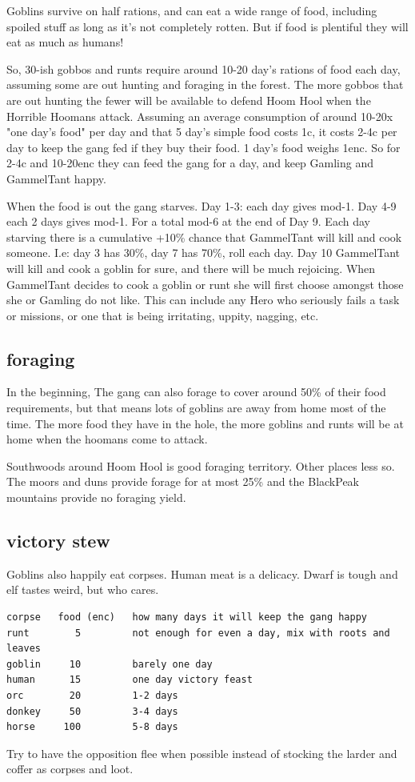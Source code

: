 Goblins survive on half rations, and can eat a wide range of food, including spoiled stuff as long as it's not completely rotten. But if food is plentiful they will eat as much as humans!

So, 30-ish gobbos and runts require around 10-20 day's rations of food each day, assuming some are out hunting and foraging in the forest. The more gobbos that are out hunting the fewer will be available to defend Hoom Hool when the Horrible Hoomans attack.
Assuming an average consumption of around 10-20x "one day's food" per day and that 5 day's simple food costs 1c, it costs 2-4c per day to keep the gang fed if they buy their food. 1 day's food weighs 1enc. So for 2-4c and 10-20enc they can feed the gang for a day, and keep Gamling and GammelTant happy.

When the food is out the gang starves. Day 1-3: each day gives mod-1. Day 4-9 each 2 days gives mod-1. For a total mod-6 at the end of Day 9.
Each day starving there is a cumulative +10\% chance that GammelTant will kill and cook someone. I.e: day 3 has 30\%, day 7 has 70\%, roll each day.
Day 10 GammelTant will kill and cook a goblin for sure, and there will be much rejoicing.
When GammelTant decides to cook a goblin or runt she will first choose amongst those she or Gamling do not like. This can include any Hero who seriously fails a task or missions, or one that is being irritating, uppity, nagging, etc.


\subsection*{foraging}

In the beginning, The gang can also forage to cover around 50\% of their food requirements, but that means lots of goblins are away from home most of the time. The more food they have in the hole, the more goblins and runts will be at home when the hoomans come to attack.

Southwoods around Hoom Hool is good foraging territory. Other places less so. The moors and duns provide forage for at most 25\% and the BlackPeak mountains provide no foraging yield.


\subsection*{victory stew}

Goblins also happily eat corpses. Human meat is a delicacy. Dwarf is tough and elf tastes weird, but who cares.
\small \begin{samepage} \begin{verbatim}
corpse   food (enc)   how many days it will keep the gang happy
runt        5         not enough for even a day, mix with roots and leaves
goblin     10         barely one day
human      15         one day victory feast
orc        20         1-2 days
donkey     50         3-4 days
horse     100         5-8 days
\end{verbatim} \end{samepage} \normalsize
Try to have the opposition flee when possible instead of stocking the larder and coffer as corpses and loot.


